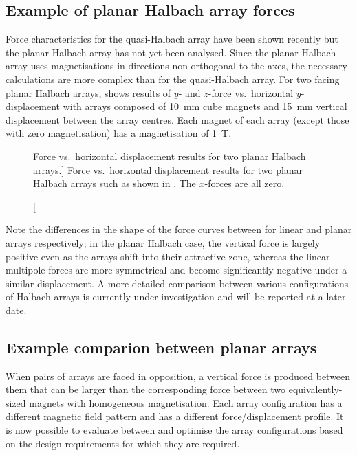 \documentclass[11pt,a4paper]{memoir}
\begin{document}
\subsection{Example of planar Halbach array forces}

Force characteristics for the quasi-Halbach array have been shown recently \cite{janssen2009-jsdd} but the planar Halbach array has not yet been analysed.
Since the planar Halbach array uses magnetisations in directions non-orthogonal to the axes, the necessary calculations are more complex than for the quasi-Halbach array.
For two facing planar Halbach arrays,  shows results of $y$- and $z$-force vs.\ horizontal $y$-displacement with arrays composed of \SI{10}{mm} cube magnets and \SI{15}{mm} vertical displacement between the array centres.
Each magnet of each array (except those with zero magnetisation) has a magnetisation of \SI{1}{T}.

\begin{figure}
\centering
{}
\caption
[Force vs.\ horizontal displacement results for two planar Halbach arrays.]
{Force vs.\ horizontal displacement results for two planar Halbach arrays such as shown in . The $x$-forces are all zero.}
\end{figure}

Note the differences in the shape of the force curves between  for linear and planar arrays respectively; in the planar Halbach case, the vertical force is largely positive even as the arrays shift into their attractive zone, whereas the linear multipole forces are more symmetrical and become significantly negative under a similar displacement.
A more detailed comparison between various configurations of Halbach arrays is currently under investigation and will be reported at a later date.

\subsection{Example comparion between planar arrays}

When pairs of arrays are faced in opposition, a vertical force is produced between them that can be larger than the corresponding force between two equivalently-sized magnets with homogeneous magnetisation.
Each array configuration has a different magnetic field pattern and has a different force/displacement profile.
It is now possible to evaluate between and optimise the array configurations based on the design requirements for which they are required.
\end{document}
